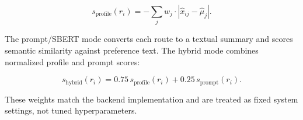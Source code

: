 \begin{equation}
s_{\mathrm{profile}}(r_i) = - \sum_j w_j \cdot |\hat{x}_{ij} - \hat{\mu}_{j}|.
\end{equation}

The prompt/SBERT mode converts each route to a textual summary and scores semantic similarity against preference text. The hybrid mode combines normalized profile and prompt scores:

\begin{equation}
s_{\mathrm{hybrid}}(r_i) = 0.75\,s_{\mathrm{profile}}(r_i) + 0.25\,s_{\mathrm{prompt}}(r_i).
\end{equation}

These weights match the backend implementation and are treated as fixed system settings, not tuned hyperparameters.
